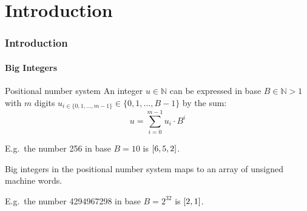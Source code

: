 \section{Introduction}
\begin{frame}
  \frametitle{Introduction}
  \framesubtitle{Big Integers}
  \begin{block}{Positional number system}\scriptsize
      An integer $u \in \mathbb{N}$ can be expressed in base $B \in \mathbb{N}>1$ with
  $m$ digits $u_{i\in \{0,1,\ldots,m-1\}}\in\{0,1,\ldots,B-1\}$ by the sum:\vspace*{-0.5em}
  \begin{equation}
u = \sum_{i=0}^{m-1}u_i\cdot B^{i}
\end{equation}
\end{block}
\pause
E.g.\ the number 256 in base $B=10$ is $\mathtt{[}6, 5, 2\mathtt{]}$.

\pause
Big integers in the positional number system maps to an array of unsigned machine words.

\pause
E.g.\ the number 4294967298 in base $B=2^{32}$ is $\mathtt{[}2,1\mathtt{]}$.
\end{frame}



